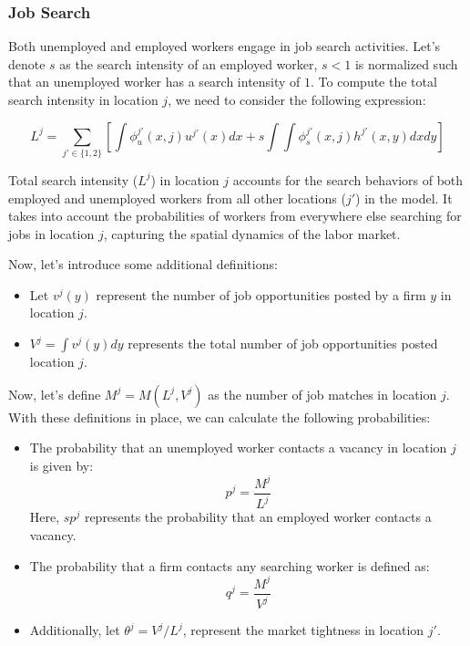 \documentclass[
  letterpaper,
  DIV=11,
  numbers=noendperiod]{scrartcl}
\begin{document}
\hypertarget{job-search}{%
\subsubsection{Job Search}\label{job-search}}

Both unemployed and employed workers engage in job search activities.
Let's denote \(s\) as the search intensity of an employed worker,
\(s < 1\) is normalized such that an unemployed worker has a search
intensity of \(1\). To compute the total search intensity in location
\(j\), we need to consider the following expression:

\[
L^j = \sum_{j'\in\{1,2\}}\left[\int \phi_u^{j'}(x,j)u^{j'}(x) dx + s\int\int \phi_s^{j'}(x,j)h^{j'}(x,y)dx dy\right]
\]

Total search intensity (\(L^j\)) in location \(j\) accounts for the
search behaviors of both employed and unemployed workers from all other
locations (\(j'\)) in the model. It takes into account the probabilities
of workers from everywhere else searching for jobs in location \(j\),
capturing the spatial dynamics of the labor market.

Now, let's introduce some additional definitions:

\begin{itemize}
\item
  Let \(v^j(y)\) represent the number of job opportunities posted by a
  firm \(y\) in location \(j\).
\item
  \(V^j = \int v^j(y) dy\) represents the total number of job
  opportunities posted location \(j\).
\end{itemize}

Now, let's define \(M^j = M(L^j, V^j)\) as the number of job matches in
location \(j\). With these definitions in place, we can calculate the
following probabilities:

\begin{itemize}
\item
  The probability that an unemployed worker contacts a vacancy in
  location \(j\) is given by: \[p^j = \frac{M^j}{L^j}\] Here, \(sp^j\)
  represents the probability that an employed worker contacts a vacancy.
\item
  The probability that a firm contacts any searching worker is defined
  as: \[q^j = \frac{M^j}{V^j}\]
\item
  Additionally, let \(\theta^j = V^j / L^j\), represent the market
  tightness in location \(j'\).
\end{itemize}
\end{document}
